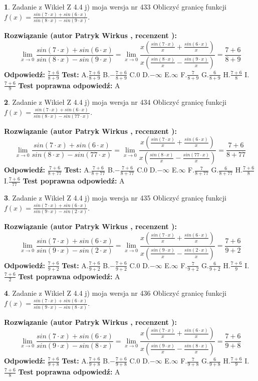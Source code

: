 \documentclass[12pt, a4paper]{article}
\theoremstyle{definition} %
\newtheorem{zad}{}
\newcommand{\zadStart}[1]{\begin{zad}#1\newline}
\newcommand{\zadStop}{\end{zad}}
\newcommand{\rozwStart}[2]{\noindent \textbf{Rozwiązanie (autor #1 , recenzent #2): }\newline}
\newcommand{\rozwStop}{\newline}
\newcommand{\odpStart}{\noindent \textbf{Odpowiedź:}\newline}
\newcommand{\odpStop}{\newline}
\newcommand{\testStart}{\noindent \textbf{Test:}\newline}
\newcommand{\testStop}{\newline}
\newcommand{\kluczStart}{\noindent \textbf{Test poprawna odpowiedź:}\newline}
\newcommand{\kluczStop}{\newline}
\begin{document}
\zadStart{Zadanie z Wikieł Z 4.4 j) moja wersja nr 433}
Obliczyć granicę funkcji $f(x)=\frac{sin(7\cdot x) +sin(6\cdot x)}{sin(8\cdot x) -sin(9\cdot x)}$.
\zadStop
\rozwStart{Patryk Wirkus}{}
$$\lim\limits_{x\to 0}\frac{sin(7\cdot x) +sin(6\cdot x)}{sin(8\cdot x) -sin(9\cdot x)}=\lim\limits_{x\to 0}\frac{x(\frac{sin(7\cdot x)}{x}+\frac{sin(6\cdot x)}{x})}{x(\frac{sin(8\cdot x)}{x}-\frac{sin(9\cdot x)}{x})}=\frac{7+6}{8+9}$$
\rozwStop
\odpStart
$\frac{7+6}{8+9}$
\odpStop
\testStart
A.$\frac{7+6}{8+9}$
B.$-\frac{7+6}{8+9}$
C.$0$
D.$-\infty$
E.$\infty$
F.$\frac{7}{8+9}$
G.$\frac{6}{8+9}$
H.$\frac{7+6}{8}$
I.$\frac{7+6}{9}$
\testStop
\kluczStart
A
\kluczStop



\zadStart{Zadanie z Wikieł Z 4.4 j) moja wersja nr 434}
Obliczyć granicę funkcji $f(x)=\frac{sin(7\cdot x) +sin(6\cdot x)}{sin(8\cdot x) -sin(77\cdot x)}$.
\zadStop
\rozwStart{Patryk Wirkus}{}
$$\lim\limits_{x\to 0}\frac{sin(7\cdot x) +sin(6\cdot x)}{sin(8\cdot x) -sin(77\cdot x)}=\lim\limits_{x\to 0}\frac{x(\frac{sin(7\cdot x)}{x}+\frac{sin(6\cdot x)}{x})}{x(\frac{sin(8\cdot x)}{x}-\frac{sin(77\cdot x)}{x})}=\frac{7+6}{8+77}$$
\rozwStop
\odpStart
$\frac{7+6}{8+77}$
\odpStop
\testStart
A.$\frac{7+6}{8+77}$
B.$-\frac{7+6}{8+77}$
C.$0$
D.$-\infty$
E.$\infty$
F.$\frac{7}{8+77}$
G.$\frac{6}{8+77}$
H.$\frac{7+6}{8}$
I.$\frac{7+6}{77}$
\testStop
\kluczStart
A
\kluczStop



\zadStart{Zadanie z Wikieł Z 4.4 j) moja wersja nr 435}
Obliczyć granicę funkcji $f(x)=\frac{sin(7\cdot x) +sin(6\cdot x)}{sin(9\cdot x) -sin(2\cdot x)}$.
\zadStop
\rozwStart{Patryk Wirkus}{}
$$\lim\limits_{x\to 0}\frac{sin(7\cdot x) +sin(6\cdot x)}{sin(9\cdot x) -sin(2\cdot x)}=\lim\limits_{x\to 0}\frac{x(\frac{sin(7\cdot x)}{x}+\frac{sin(6\cdot x)}{x})}{x(\frac{sin(9\cdot x)}{x}-\frac{sin(2\cdot x)}{x})}=\frac{7+6}{9+2}$$
\rozwStop
\odpStart
$\frac{7+6}{9+2}$
\odpStop
\testStart
A.$\frac{7+6}{9+2}$
B.$-\frac{7+6}{9+2}$
C.$0$
D.$-\infty$
E.$\infty$
F.$\frac{7}{9+2}$
G.$\frac{6}{9+2}$
H.$\frac{7+6}{9}$
I.$\frac{7+6}{2}$
\testStop
\kluczStart
A
\kluczStop



\zadStart{Zadanie z Wikieł Z 4.4 j) moja wersja nr 436}
Obliczyć granicę funkcji $f(x)=\frac{sin(7\cdot x) +sin(6\cdot x)}{sin(9\cdot x) -sin(8\cdot x)}$.
\zadStop
\rozwStart{Patryk Wirkus}{}
$$\lim\limits_{x\to 0}\frac{sin(7\cdot x) +sin(6\cdot x)}{sin(9\cdot x) -sin(8\cdot x)}=\lim\limits_{x\to 0}\frac{x(\frac{sin(7\cdot x)}{x}+\frac{sin(6\cdot x)}{x})}{x(\frac{sin(9\cdot x)}{x}-\frac{sin(8\cdot x)}{x})}=\frac{7+6}{9+8}$$
\rozwStop
\odpStart
$\frac{7+6}{9+8}$
\odpStop
\testStart
A.$\frac{7+6}{9+8}$
B.$-\frac{7+6}{9+8}$
C.$0$
D.$-\infty$
E.$\infty$
F.$\frac{7}{9+8}$
G.$\frac{6}{9+8}$
H.$\frac{7+6}{9}$
I.$\frac{7+6}{8}$
\testStop
\kluczStart
A
\kluczStop
\end{document}
